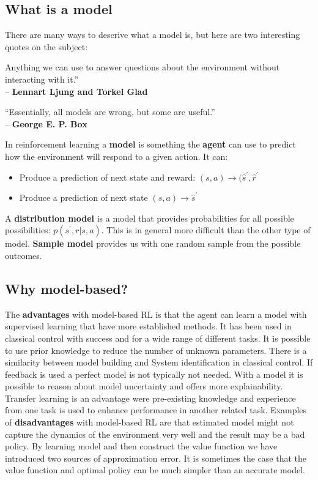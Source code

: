 \subsection*{What is a model}
There are many ways to descrive what a model is, but here are two interesting quotes on the subject:


\begin{wbox}{}
\begin{center}
Anything we can use to answer questions about the environment without interacting
with it.” \\– \textbf{Lennart Ljung and Torkel Glad}

\vspace{0.5 cm}

“Essentially, all models are wrong, but some are useful.” \\– \textbf{George E. P. Box}
\end{center}
\end{wbox}

In reinforcement learning a \textbf{model} is something the \textbf{agent} can use to predict how the environment will respond to a given action. It can:
	
\begin{itemize}
	\item Produce a prediction of next state and reward: $(s,a) \rightarrow (\hat{s}^{\prime}, \hat{r}^{\prime}$
	\item Produce a prediction of next state $(s,a) \rightarrow \hat{s}^{\prime}$
\end{itemize}

A \textbf{distribution model} is a model that provides probabilities for all possible possibilities: $p(s^{\prime}, r|s,a)$. This is in general more difficult than the other type of model. \textbf{Sample model} provides us with one random sample from the possible outcomes. 

\subsection*{Why model-based?}
The \textbf{advantages} with model-based RL is that the agent can learn a model with supervised learning that have more established methods. It has been used in classical control with success and for a wide range of different tasks. It is possible to use prior knowledge to reduce the number of unknown parameters. There is a similarity between model building and System identification in classical control. If feedback is used a perfect model is not typically not needed. With a model it is possible to reason about model uncertainty and offers more explainability. Transfer learning is an advantage were pre-existing knowledge and experience from one task is used to enhance performance in another related task. Examples of \textbf{disadvantages} with model-based RL are that estimated model might not capture the dynamics of the environment very well and the result may be a bad policy. By learning model and then construct the value function we have introduced two sources of approximation error. It is sometimes the case that the value function and optimal policy can be much simpler than an accurate model. 

